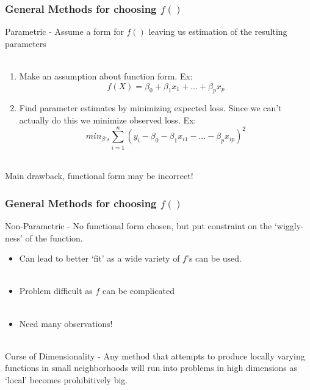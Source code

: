 \documentclass[hide notes,red,handout]{beamer}
\begin{document}
\begin{frame}[t]
\frametitle{General Methods for choosing $f()$}
Parametric - Assume a form for $f()$ leaving us estimation of the resulting parameters \\~\\\pause
\begin{enumerate}
\item Make an assumption about function form.  Ex:
$$f(X)=\beta_0+\beta_1 x_1+...+\beta_p x_p$$\pause
\item Find parameter estimates by minimizing expected loss.  Since we can't actually do this we minimize observed loss.  Ex:
$$min_{\beta's}\sum_{i=1}^{n}(y_i-\beta_0-\beta_1x_{i1}-...-\beta_px_{ip})^2$$~\\
\end{enumerate}
Main drawback, functional form may be incorrect!
\end{frame} 


\begin{frame}[t]
\frametitle{General Methods for choosing $f()$}
Non-Parametric - No functional form chosen, but put constraint on the `wiggly-ness' of the function.\\\pause
\begin{itemize}
\item Can lead to better `fit' as a wide variety of $f$'s can be used.\\~\\
\item Problem difficult as $f$ can be complicated\\~\\
\item Need many observations!\\~\\\pause
\end{itemize}
Curse of Dimensionality - Any method that attempts to produce locally varying functions in small neighborhoods will run into problems in high dimensions as `local' becomes prohibitively big.
\end{frame}
\end{document}
